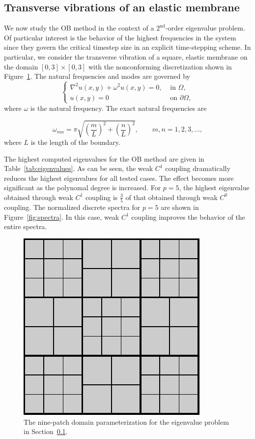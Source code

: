 \subsection{Transverse vibrations of an elastic membrane}\label{sec:eigenvalue}

We now study the OB method in the context of a $2^\text{nd}$-order eigenvalue problem. Of particular interest is the behavior of the highest frequencies in the system since they govern the critical timestep size in an explicit time-stepping scheme. In particular, we consider the transverse vibration of a square, elastic membrane on the domain $\left[{0,3}\right] \times \left[{0,3}\right]$ with the nonconforming discretization shown in Figure~\ref{fig:eigenvalue_mesh}. The natural frequencies and modes are governed by
\begin{equation}
	\left\{\begin{split}
		\nabla^2 u(x,y) +\omega^2 u(x,y) = 0, & \text{ in } \Omega,\\
		u(x, y) = 0 & \text{ on } \partial \Omega,
	\end{split}\right.
\end{equation}
where $\omega$ is the natural frequency. The exact natural frequencies are

\begin{equation}
	\omega_{mn} = \pi \sqrt{\left(\frac{m}{L}\right)^2+\left(\frac{n}{L}\right)^2},\quad\quad m,n = 1,2,3,\dots,
\end{equation}
where $L$ is the length of the boundary.\par

The highest computed eigenvalues for the OB method are given in Table~\ref{tab:eigenvalues}. As can be seen, the weak $C^1$ coupling dramatically reduces the highest eigenvalues for all tested cases. The effect becomes more significant as the polynomal degree is increased. For $p=5$, the highest eigenvalue obtained through weak $C^1$ coupling is $\frac{3}{5}$ of that obtained through weak $C^0$ coupling. The normalized discrete spectra for $p=5$ are shown in Figure~\ref{fig:spectra}. In this case, weak $C^1$ coupling improves the behavior of the entire spectra.

\begin{figure}[ht]
	\centering
	\includegraphics[width=.3\textwidth]{eigenvalue_mesh}
	\caption{The nine-patch domain parameterization for the eigenvalue problem in Section~\ref{sec:eigenvalue}.}\label{fig:eigenvalue_mesh}
\end{figure}

